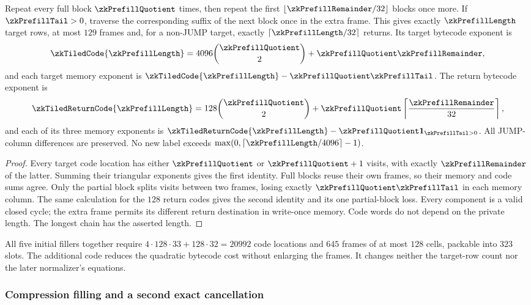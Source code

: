 \begin{lemma}\label{lem:zk-tiled-prefill}
Repeat every full block $\zkPrefillQuotient$ times, then repeat the first $\lfloor\zkPrefillRemainder/32\rfloor$ blocks once more. If $\zkPrefillTail>0$, traverse the corresponding suffix of the next block once in the extra frame. This gives exactly $\zkPrefillLength$ target rows, at most $129$ frames and, for a non-JUMP target, exactly $\lceil\zkPrefillLength/32\rceil$ returns. Its target bytecode exponent is
\[
 \zkTiledCode{\zkPrefillLength}
 =4096\binom{\zkPrefillQuotient}{2}
  +\zkPrefillQuotient\zkPrefillRemainder,
\]
and each target memory exponent is $\zkTiledCode{\zkPrefillLength}-\zkPrefillQuotient\zkPrefillTail$. The return bytecode exponent is
\[
 \zkTiledReturnCode{\zkPrefillLength}
 =128\binom{\zkPrefillQuotient}{2}
  +\zkPrefillQuotient\left\lceil\frac{\zkPrefillRemainder}{32}\right\rceil,
\]
and each of its three memory exponents is $\zkTiledReturnCode{\zkPrefillLength}-\zkPrefillQuotient\mathbf1_{\zkPrefillTail>0}$. All JUMP-column differences are preserved. No new label exceeds $\max(0,\lceil\zkPrefillLength/4096\rceil-1)$.
\end{lemma}
\begin{proof}
Every target code location has either $\zkPrefillQuotient$ or $\zkPrefillQuotient+1$ visits, with exactly $\zkPrefillRemainder$ of the latter. Summing their triangular exponents gives the first identity. Full blocks reuse their own frames, so their memory and code sums agree. Only the partial block splits visits between two frames, losing exactly $\zkPrefillQuotient\zkPrefillTail$ in each memory column. The same calculation for the $128$ return codes gives the second identity and its one partial-block loss. Every component is a valid closed cycle; the extra frame permits its different return destination in write-once memory. Code words do not depend on the private length. The longest chain has the asserted length.
\end{proof}

All five initial fillers together require $4\cdot128\cdot33+128\cdot32=20992$ code locations and $645$ frames of at most $128$ cells, packable into $323$ slots. The additional code reduces the quadratic bytecode cost without enlarging the frames. It changes neither the target-row count nor the later normalizer's equations.

\subsubsection{Compression filling and a second exact cancellation}

